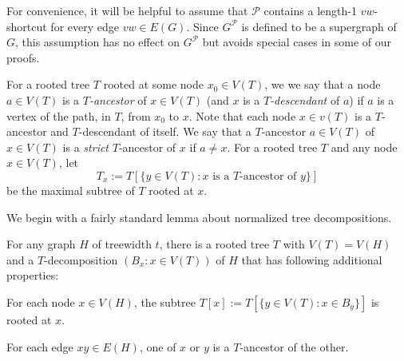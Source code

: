 \documentclass{patmorin}
\newcommand{\tlabel}[1]{\label{t:#1}}
\newcommand{\PP}{\mathcal{P}}
\renewcommand{\le}{\leqslant}
\begin{document}
For convenience, it will be helpful to assume that $\mathcal{P}$ contains a length-1 $vw$-shortcut for every edge $vw\in E(G)$.  Since $G^\PP$ is defined to be a supergraph of $G$, this assumption has no effect on $G^{\mathcal{P}}$ but avoids special cases in some of our proofs.

For a rooted tree $T$ rooted at some node $x_0\in V(T)$, we we say that a node $a\in V(T)$ is a \emph{$T$-ancestor} of $x\in V(T)$ (and $x$ is a \emph{$T$-descendant} of $a$) if $a$ is a vertex of the path, in $T$, from $x_0$ to $x$.  Note that each node $x\in v(T)$ is a $T$-ancestor and $T$-descendant of itself.  We say that a $T$-ancestor $a\in V(T)$ of $x\in V(T)$ is a \emph{strict} $T$-ancestor of $x$ if $a\neq x$. For a rooted tree $T$ and any node $x\in V(T)$, let  
\[T_x := T[\{y\in V(T):\mbox{$x$ is a $T$-ancestor of $y$}\}] \]
be the maximal subtree of $T$ rooted at $x$.  

We begin with a fairly standard lemma about normalized tree decompositions. 

\begin{lem}
  For any graph $H$ of treewidth $t$, there is a rooted tree $T$ with $V(T)=V(H)$ and a $T$-decomposition $(B_x:x\in V(T))$ of $H$ that has following additional properties:  
  \begin{compactenum}[(T1)]
    \item\tlabel{subtree-root} For each node $x\in V(H)$, the subtree $T[x]:=T[\{y\in V(T):x\in B_y\}]$ is rooted at $x$.
    \item\tlabel{ancestor-edge}\tlabel{last} For each edge $xy\in E(H)$, one of $x$ or $y$ is a $T$-ancestor of the other.
  \end{compactenum}
\end{lem}
\end{document}
